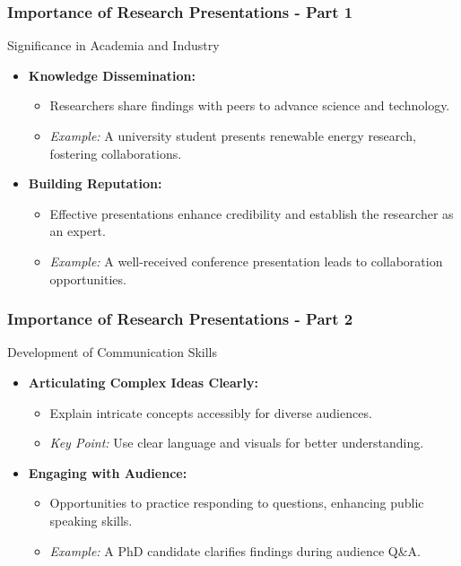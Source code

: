 \documentclass[aspectratio=169]{beamer}
\begin{document}
\begin{frame}[fragile]
    \frametitle{Importance of Research Presentations - Part 1}
    
    \begin{block}{Significance in Academia and Industry}
        \begin{itemize}
            \item \textbf{Knowledge Dissemination:}
            \begin{itemize}
                \item Researchers share findings with peers to advance science and technology.
                \item \emph{Example:} A university student presents renewable energy research, fostering collaborations.
            \end{itemize}
            
            \item \textbf{Building Reputation:}
            \begin{itemize}
                \item Effective presentations enhance credibility and establish the researcher as an expert.
                \item \emph{Example:} A well-received conference presentation leads to collaboration opportunities.
            \end{itemize}
        \end{itemize}
    \end{block}    
\end{frame}

\begin{frame}[fragile]
    \frametitle{Importance of Research Presentations - Part 2}

    \begin{block}{Development of Communication Skills}
        \begin{itemize}
            \item \textbf{Articulating Complex Ideas Clearly:}
            \begin{itemize}
                \item Explain intricate concepts accessibly for diverse audiences.
                \item \emph{Key Point:} Use clear language and visuals for better understanding.
            \end{itemize}
            
            \item \textbf{Engaging with Audience:}
            \begin{itemize}
                \item Opportunities to practice responding to questions, enhancing public speaking skills.
                \item \emph{Example:} A PhD candidate clarifies findings during audience Q&A.
            \end{itemize}
        \end{itemize}
    \end{block}
\end{frame}
\end{document}
